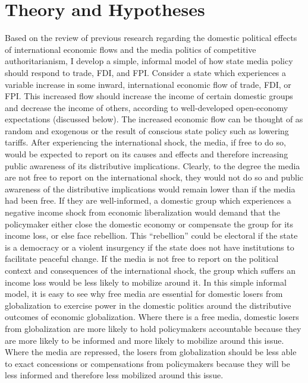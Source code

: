 \documentclass[12pt,a4paper]{article}\usepackage[]{graphicx}\usepackage[]{color}
\begin{document}
\section{Theory and Hypotheses}

Based on the review of previous research regarding the domestic political effects of international economic flows and the media politics of competitive authoritarianism, I develop a simple, informal model of how state media policy should respond to trade, FDI, and FPI. Consider a state which experiences a variable increase in some inward, international economic flow of trade, FDI, or FPI. This increased flow should increase the income of certain domestic groups and decrease the income of others, according to well-developed open-economy expectations (discussed below). The increased economic flow can be thought of as random and exogenous or the result of conscious state policy such as lowering tariffs. After experiencing the international shock, the media, if free to do so, would be expected to report on its causes and effects and therefore increasing public awareness of its distributive implications. Clearly, to the degree the media are not free to report on the international shock, they would not do so and public awareness of the distributive implications would remain lower than if the media had been free. If they are well-informed, a domestic group which experiences a negative income shock from economic liberalization would demand that the policymaker either close the domestic economy or compensate the group for its income loss, or else face rebellion. This “rebellion” could be electoral if the state is a democracy or a violent insurgency if the state does not have institutions to facilitate peaceful change. If the media is not free to report on the political context and consequences of the international shock, the group which suffers an income loss would be less likely to mobilize around it. In this simple informal model, it is easy to see why free media are essential for domestic losers from globalization to exercise power in the domestic politics around the distributive outcomes of economic globalization. Where there is a free media, domestic losers from globalization are more likely to hold policymakers accountable because they are more likely to be informed and more likely to mobilize around this issue. Where the media are repressed, the losers from globalization should be less able to exact concessions or compensations from policymakers because they will be less informed and therefore less mobilized around this issue.
\end{document}
